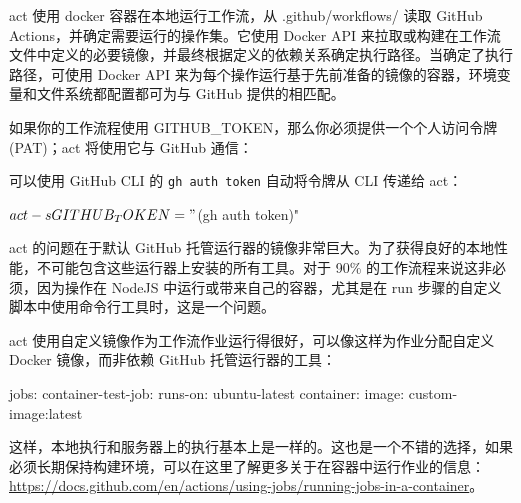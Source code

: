 
act 使用 docker 容器在本地运行工作流，从 .github/workflows/ 读取 GitHub Actions，并确定需要运行的操作集。它使用 Docker API 来拉取或构建在工作流文件中定义的必要镜像，并最终根据定义的依赖关系确定执行路径。当确定了执行路径，可使用 Docker API 来为每个操作运行基于先前准备的镜像的容器，环境变量和文件系统都配置都可为与 GitHub 提供的相匹配。

如果你的工作流程使用 GITHUB\_TOKEN，那么你必须提供一个个人访问令牌 (PAT)；act 将使用它与 GitHub 通信：


可以使用 GitHub CLI 的 \verb|gh auth token| 自动将令牌从 CLI 传递给 act：

\begin{shell}
$ act -s GITHUB_TOKEN="$(gh auth token)"
\end{shell}


act 的问题在于默认 GitHub 托管运行器的镜像非常巨大。为了获得良好的本地性能，不可能包含这些运行器上安装的所有工具。对于 90\% 的工作流程来说这非必须，因为操作在 NodeJS 中运行或带来自己的容器，尤其是在 run 步骤的自定义脚本中使用命令行工具时，这是一个问题。

act 使用自定义镜像作为工作流作业运行得很好，可以像这样为作业分配自定义 Docker 镜像，而非依赖 GitHub 托管运行器的工具：

\begin{shell}
jobs:
  container-test-job:
    runs-on: ubuntu-latest
    container:
      image: custom-image:latest
\end{shell}

这样，本地执行和服务器上的执行基本上是一样的。这也是一个不错的选择，如果必须长期保持构建环境，可以在这里了解更多关于在容器中运行作业的信息：\url{https://docs.github.com/en/actions/using-jobs/running-jobs-in-a-container}。